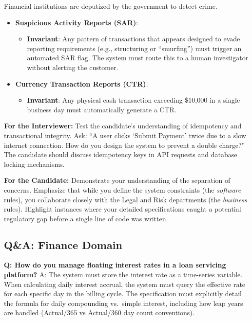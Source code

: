 \documentclass[
  11pt,
  openany,
  oneside]{book}
\providecommand{\tightlist}{%
  \setlength{\itemsep}{0pt}\setlength{\parskip}{0pt}}
\renewenvironment{quote}{\begin{customquote}}{\end{customquote}}
\begin{document}
Financial institutions are deputized by the government to detect crime.

\begin{itemize}
\tightlist
\item
  \textbf{Suspicious Activity Reports (SAR)}:

  \begin{itemize}
  \tightlist
  \item
    \textbf{Invariant}: Any pattern of transactions that appears
    designed to evade reporting requirements (e.g., structuring or
    ``smurfing'') must trigger an automated SAR flag. The system must
    route this to a human investigator without alerting the customer.
  \end{itemize}
\item
  \textbf{Currency Transaction Reports (CTR)}:

  \begin{itemize}
  \tightlist
  \item
    \textbf{Invariant}: Any physical cash transaction exceeding \$10,000
    in a single business day must automatically generate a CTR.
  \end{itemize}
\end{itemize}

\begin{quote}
\textbf{For the Interviewer:} Test the candidate's understanding of
idempotency and transactional integrity. Ask: ``A user clicks `Submit
Payment' twice due to a slow internet connection. How do you design the
system to prevent a double charge?'' The candidate should discuss
idempotency keys in API requests and database locking mechanisms.
\end{quote}

\begin{quote}
\textbf{For the Candidate:} Demonstrate your understanding of the
separation of concerns. Emphasize that while you define the system
constraints (the \emph{software} rules), you collaborate closely with
the Legal and Risk departments (the \emph{business} rules). Highlight
instances where your detailed specifications caught a potential
regulatory gap before a single line of code was written.
\end{quote}

\subsection{Q\&A: Finance Domain}\label{qa-finance-domain}

\textbf{Q: How do you manage floating interest rates in a loan servicing
platform?} A: The system must store the interest rate as a time-series
variable. When calculating daily interest accrual, the system must query
the effective rate for each specific day in the billing cycle. The
specification must explicitly detail the formula for daily compounding
vs.~simple interest, including how leap years are handled (Actual/365 vs
Actual/360 day count conventions).
\end{document}
